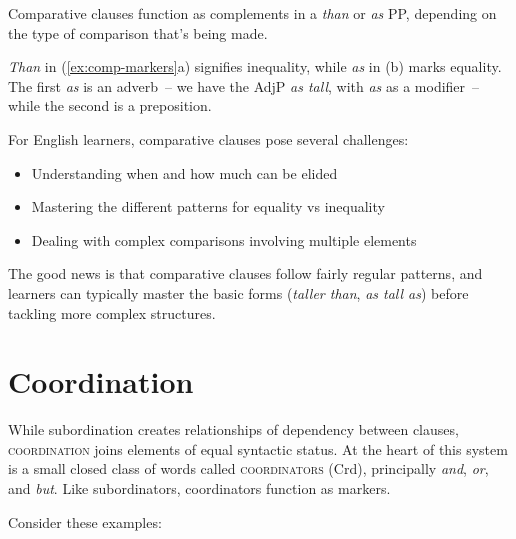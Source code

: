 Comparative clauses function as complements in a \textit{than} or \textit{as} PP, depending on the type of comparison that's being made.

\ea \label{ex:comp-markers}
    \z
\z
{}

\textit{Than} in (\ref{ex:comp-markers}a) signifies inequality, while \textit{as} in (b) marks equality. The first \textit{as} is an adverb~-- we have the AdjP \textit{as tall}, with \textit{as} as a modifier~-- while the second is a preposition.

For English learners, comparative clauses pose several challenges:
\begin{itemize}[noitemsep]
    \item Understanding when and how much can be elided
    \item Mastering the different patterns for equality vs inequality
    \item Dealing with complex comparisons involving multiple elements
\end{itemize}

The good news is that comparative clauses follow fairly regular patterns, and learners can typically master the basic forms (\textit{taller than}, \textit{as tall as}) before tackling more complex structures.

\section{Coordination}\label{sec:coordination}

While subordination creates relationships of dependency between clauses, \textsc{coordination} joins elements of equal syntactic status. At the heart of this system is a small closed class of words called \textsc{coordinators} (Crd), principally \textit{and}, \textit{or}, and \textit{but}. Like subordinators, coordinators function as markers.

Consider these examples:


